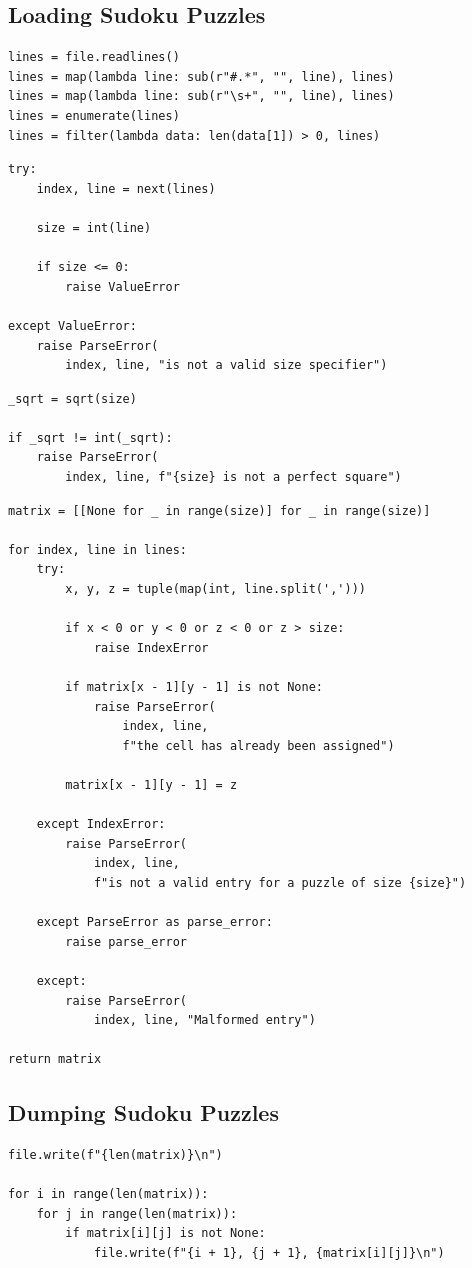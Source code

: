 \documentclass[12pt]{article}
\begin{document}
\pagebreak

\subsection{Loading Sudoku Puzzles}

\begin{lstlisting}[caption={TODO}]
lines = file.readlines()
lines = map(lambda line: sub(r"#.*", "", line), lines)
lines = map(lambda line: sub(r"\s+", "", line), lines)
lines = enumerate(lines)
lines = filter(lambda data: len(data[1]) > 0, lines)
\end{lstlisting}

\begin{lstlisting}[caption={TODO}]
try:
    index, line = next(lines)

    size = int(line)

    if size <= 0:
        raise ValueError

except ValueError:
    raise ParseError(
        index, line, "is not a valid size specifier")
\end{lstlisting}

\begin{lstlisting}[caption={TODO}]
_sqrt = sqrt(size)

if _sqrt != int(_sqrt):
    raise ParseError(
        index, line, f"{size} is not a perfect square")
\end{lstlisting}

\begin{lstlisting}[caption={TODO}]
matrix = [[None for _ in range(size)] for _ in range(size)]

for index, line in lines:
    try:
        x, y, z = tuple(map(int, line.split(',')))

        if x < 0 or y < 0 or z < 0 or z > size:
            raise IndexError

        if matrix[x - 1][y - 1] is not None:
            raise ParseError(
                index, line,
                f"the cell has already been assigned")

        matrix[x - 1][y - 1] = z

    except IndexError:
        raise ParseError(
            index, line,
            f"is not a valid entry for a puzzle of size {size}")

    except ParseError as parse_error:
        raise parse_error

    except:
        raise ParseError(
            index, line, "Malformed entry")

return matrix
\end{lstlisting}

\pagebreak

\subsection{Dumping Sudoku Puzzles}

\begin{lstlisting}[caption={TODO}]
file.write(f"{len(matrix)}\n")

for i in range(len(matrix)):
    for j in range(len(matrix)):
        if matrix[i][j] is not None:
            file.write(f"{i + 1}, {j + 1}, {matrix[i][j]}\n")
\end{lstlisting}
\end{document}
